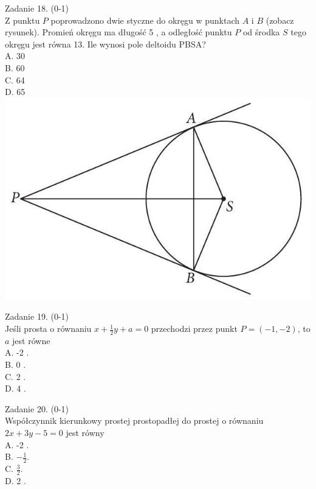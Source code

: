 \documentclass[10pt]{article}
\begin{document}
Zadanie 18. (0-1)\\
Z punktu \(P\) poprowadzono dwie styczne do okręgu w punktach \(A\) i \(B\) (zobacz rysunek). Promień okręgu ma długość 5 , a odległość punktu \(P\) od środka \(S\) tego okręgu jest równa 13. Ile wynosi pole deltoidu PBSA?\\
A. 30\\
B. 60\\
C. 64\\
D. 65\\
\includegraphics[max width=\textwidth, center]{2024_11_21_1e89351873aa60c4c1b9g-06(1)}

Zadanie 19. (0-1)\\
Jeśli prosta o równaniu \(x+\frac{1}{2} y+a=0\) przechodzi przez punkt \(P=(-1,-2)\), to \(a\) jest równe\\
A. -2 .\\
B. 0 .\\
C. 2 .\\
D. 4 .

Zadanie 20. (0-1)\\
Współczynnik kierunkowy prostej prostopadłej do prostej o równaniu \(2 x+3 y-5=0\) jest równy\\
A. -2 .\\
B. \(-\frac{1}{2}\).\\
C. \(\frac{3}{2}\).\\
D. 2 .
\end{document}
